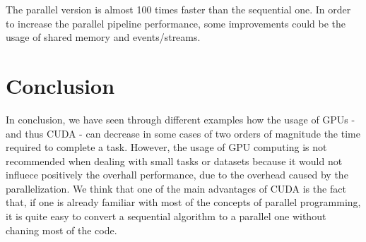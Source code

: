 \documentclass[a4paper]{article}
\begin{document}
The parallel version is almost 100 times faster than the sequential one. In order to increase the parallel pipeline performance, some improvements could be the usage of shared memory and events/streams.

\section{Conclusion}

In conclusion, we have seen through different examples how the usage of GPUs - and thus CUDA - can decrease in some cases of two orders of magnitude the time required to complete a task. However, the usage of GPU computing is not recommended when dealing with small tasks or datasets because it would not influece positively the overhall performance, due to the overhead caused by the parallelization. We think that one of the main advantages of CUDA is the fact that, if one is already familiar with most of the concepts of parallel programming, it is quite easy to convert a sequential algorithm to a parallel one without chaning most of the code.
\end{document}
